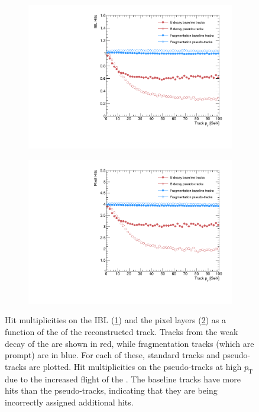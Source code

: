 %
\begin{figure}[!htbp]
    \centering
    \begin{subfigure}{.4\textwidth}
      \centering
      \includegraphics[width=\textwidth]{chapters/3.tracking/figs/overlay_po_nHitsOnIBL_From_B_pT.pdf}
      \caption{}
      \label{fig:n hits on ibl}
    \end{subfigure}%
    \begin{subfigure}{.4\textwidth}
      \centering
      \includegraphics[width=\textwidth]{chapters/3.tracking/figs/overlay_po_nHitsOnPix_From_B_pT.pdf}
      \caption{}
      \label{fig:n hits on pix}
    \end{subfigure}
    \caption{Hit multiplicities on the IBL (\ref{fig:n hits on ibl}) and the pixel layers (\ref{fig:n hits on pix}) as a function of the \pT of the reconstructed track. Tracks from the weak decay of the \bhadron are shown in red, while fragmentation tracks (which are prompt) are in blue. For each of these, standard tracks and pseudo-tracks are plotted. Hit multiplicities on the pseudo-tracks at high $p_\text{T}$ due to the increased flight of the \bhadron. The baseline tracks have more hits than the pseudo-tracks, indicating that they are being incorrectly assigned additional hits.}
    \label{fig:total hits on pix bs, frag}
\end{figure}
%







